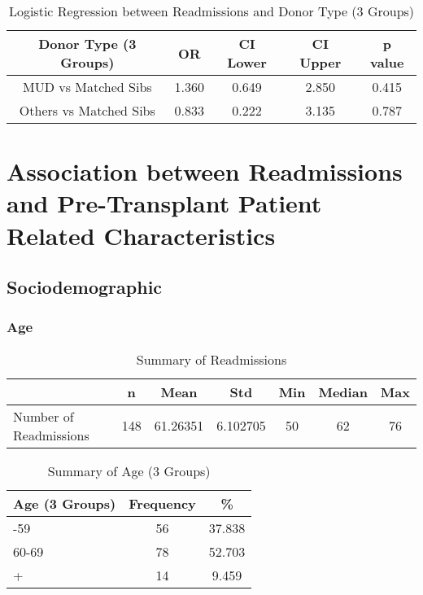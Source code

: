 \documentclass[12pt,]{article}
\begin{document}
\begin{table}[!h]

\caption{\label{tab:unnamed-chunk-2}Logistic Regression between Readmissions and Donor Type (3 Groups)}
\centering
\begin{tabular}{ccccc}
\toprule
Donor Type (3 Groups) & OR & CI Lower & CI Upper & p value\\
\midrule
MUD vs Matched Sibs & 1.360 & 0.649 & 2.850 & 0.415\\
\rowcolor[HTML]{E3E5E7}  Others vs Matched Sibs & 0.833 & 0.222 & 3.135 & 0.787\\
\bottomrule
\end{tabular}
\end{table}

\pagebreak

\section{Association between Readmissions and Pre-Transplant Patient
Related
Characteristics}\label{association-between-readmissions-and-pre-transplant-patient-related-characteristics}

\subsection{Sociodemographic}\label{sociodemographic}

\subsubsection{Age}\label{age}

\begin{table}[!h]

\caption{\label{tab:unnamed-chunk-3}Summary of Readmissions}
\centering
\begin{tabular}{>{\raggedright\arraybackslash}p{5cm}cccccc}
\toprule
  & n & Mean & Std & Min & Median & Max\\
\midrule
\rowcolor{white}  Number of Readmissions & 148 & 61.26351 & 6.102705 & 50 & 62 & 76\\
\bottomrule
\end{tabular}
\end{table}

\begin{table}[!h]

\caption{\label{tab:unnamed-chunk-3}Summary of Age (3 Groups)}
\centering
\begin{tabular}{>{\centering\arraybackslash}p{5cm}cc}
\toprule
Age (3 Groups) & Frequency & \%\\
\midrule
50-59 & 56 & 37.838\\
\rowcolor[HTML]{E3E5E7}  60-69 & 78 & 52.703\\
70+ & 14 & 9.459\\
\bottomrule
\end{tabular}
\end{table}
\end{document}
